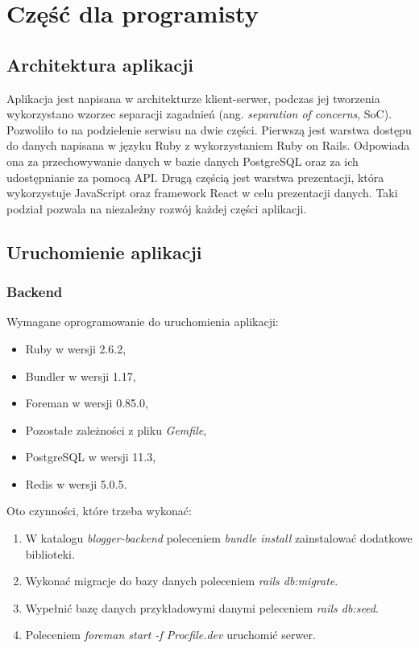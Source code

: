 \documentclass[declaration,shortabstract]{iithesis}
\begin{document}
\chapter{Część dla programisty}
\section{Architektura aplikacji}
Aplikacja jest napisana w architekturze klient-serwer, podczas jej tworzenia wykorzystano wzorzec separacji zagadnień (ang. \textit{separation of concerns}, SoC). Pozwoliło to na podzielenie serwisu na dwie części. Pierwszą jest warstwa dostępu do danych napisana w języku Ruby z wykorzystaniem Ruby on Rails. Odpowiada ona za przechowywanie danych w bazie danych PostgreSQL oraz za ich udostępnianie za pomocą API. Drugą częścią jest warstwa prezentacji, która wykorzystuje JavaScript oraz framework React w celu prezentacji danych. Taki podział pozwala na niezależny rozwój każdej części aplikacji.

\section{Uruchomienie aplikacji}

\subsection{Backend}
Wymagane oprogramowanie do uruchomienia aplikacji:
        \begin{itemize}
            \item Ruby w wersji 2.6.2,
            \item Bundler w wersji 1.17,
            \item Foreman w wersji 0.85.0,
            \item Pozostałe zależności z pliku \textit{Gemfile},
            \item PostgreSQL w wersji 11.3,
            \item Redis w wersji 5.0.5.
        \end{itemize}

Oto czynności, które trzeba wykonać:
\begin{enumerate}
    \item W katalogu \textit{blogger-backend} poleceniem \textit{bundle install} zainstalować dodatkowe biblioteki.
    \item Wykonać migracje do bazy danych poleceniem \textit{rails db:migrate}.
    \item Wypełnić bazę danych przykładowymi danymi peleceniem \textit{rails db:seed}.
    \item Poleceniem \textit{foreman start -f Procfile.dev} uruchomić serwer.
\end{enumerate}
\end{document}

